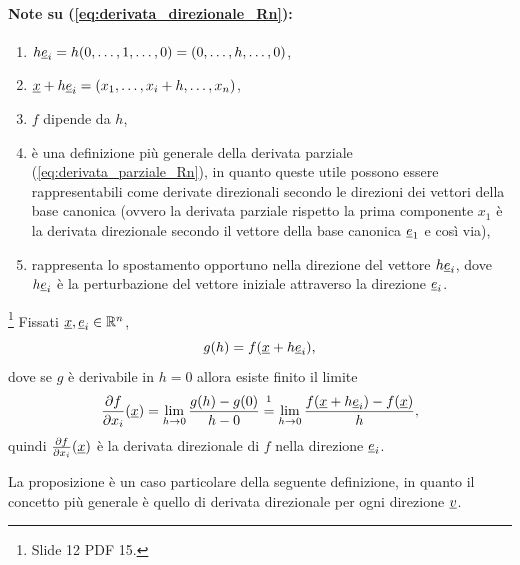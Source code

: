 \paragraph{Note su (\ref{eq:derivata_direzionale_Rn}):}
\begin{enumerate}
	\item $h\uline e_i = h(0,\hdots,1,\hdots, 0) = (0,\hdots, h, \hdots, 0)$,
	\item $\uline x + h\uline e_i = (x_1,\hdots,x_i + h, \hdots, x_n)$,
	\item $f$ dipende da $h$,
	\item è una definizione più generale della derivata parziale (\ref{eq:derivata_parziale_Rn}), in quanto queste utile possono essere rappresentabili come derivate direzionali secondo le direzioni dei vettori della base canonica (ovvero la derivata parziale rispetto la prima componente $x_1$ è la derivata direzionale secondo il vettore della base canonica $\uline e_1$ e così via),
	\item rappresenta lo spostamento opportuno nella direzione del vettore $h\uline e_i$, dove $h\uline e_i$ è la perturbazione del vettore iniziale attraverso la direzione $\uline e_i$.
\end{enumerate}

\begin{proposition}\footnote{Slide 12 PDF 15.}
	Fissati $\uline x, \uline e_i\in\mathbb{R}^n$,
	\begin{equation*}
		g(h)=f(\uline x+h\uline e_i),
	\end{equation*}
	dove se $g$ è derivabile in $h=0$ allora esiste finito il limite
	\begin{equation*}
		\frac{\partial f}{\partial x_i}(\uline x) = \lim\limits_{h\rightarrow 0}\frac{g(h) - g(0)}{h-0} \overset{\footnotemark}{=} \lim\limits_{h\rightarrow 0}\frac{f(\uline x + h\uline e_i)-f(\uline x)}{h},
	\end{equation*}
	quindi $\frac{\partial f}{\partial x_i}(\uline x)$ è la derivata direzionale di $f$ nella direzione $\uline e_i$.
\end{proposition}

La proposizione è un caso particolare della seguente definizione, in quanto il concetto più generale è quello di derivata direzionale per ogni direzione $\uline v$.

